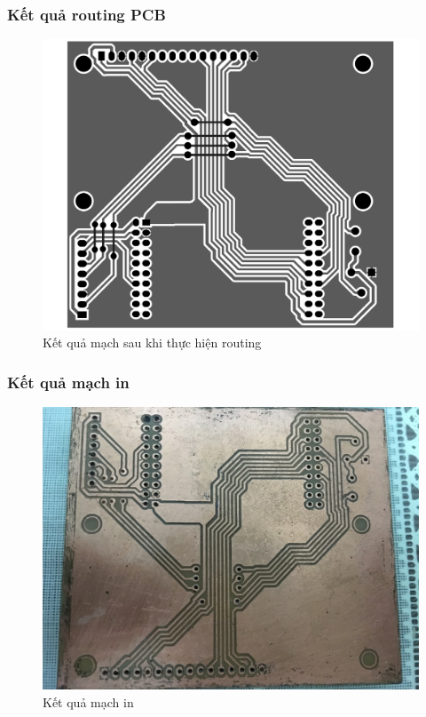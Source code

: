 \subsubsection{Kết quả routing PCB}
\begin{figure}[ht]
\centering
\includegraphics[scale=0.35]{images/routed.pdf}
\caption{Kết quả mạch sau khi thực hiện routing}
\end{figure}

\subsubsection{Kết quả mạch in}
\begin{figure}[ht]
\centering
\includegraphics[scale=0.3]{images/board_output.jpg}
\caption{Kết quả mạch in}
\end{figure}

